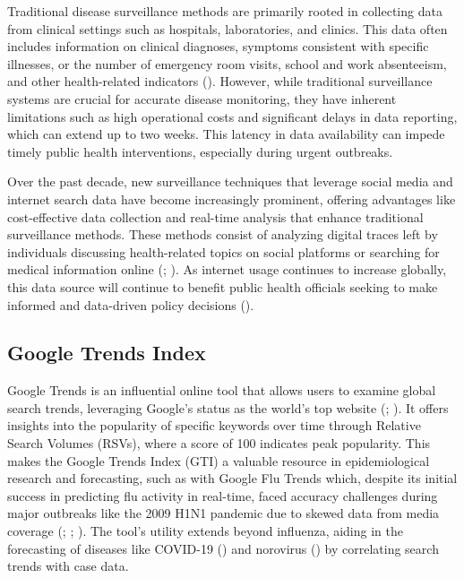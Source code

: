 \documentclass[
  12pt,
]{article}
\begin{document}
Traditional disease surveillance methods are primarily rooted in
collecting data from clinical settings such as hospitals, laboratories,
and clinics. This data often includes information on clinical diagnoses,
symptoms consistent with specific illnesses, or the number of emergency
room visits, school and work absenteeism, and other health-related
indicators (). However,
while traditional surveillance systems are crucial for accurate disease
monitoring, they have inherent limitations such as high operational
costs and significant delays in data reporting, which can extend up to
two weeks. This latency in data availability can impede timely public
health interventions, especially during urgent outbreaks.

Over the past decade, new surveillance techniques that leverage social
media and internet search data have become increasingly prominent,
offering advantages like cost-effective data collection and real-time
analysis that enhance traditional surveillance methods. These methods
consist of analyzing digital traces left by individuals discussing
health-related topics on social platforms or searching for medical
information online (; ). As
internet usage continues to increase globally, this data source will
continue to benefit public health officials seeking to make informed and
data-driven policy decisions ().

\subsection{Google Trends Index}\label{google-trends-index}

Google Trends is an influential online tool that allows users to examine
global search trends, leveraging Google's status as the world's top
website (;
). It offers insights into the
popularity of specific keywords over time through Relative Search
Volumes (RSVs), where a score of 100 indicates peak popularity. This
makes the Google Trends Index (GTI) a valuable resource in
epidemiological research and forecasting, such as with Google Flu Trends
which, despite its initial success in predicting flu activity in
real-time, faced accuracy challenges during major outbreaks like the
2009 H1N1 pandemic due to skewed data from media coverage
(;
;
). The tool's utility extends
beyond influenza, aiding in the forecasting of diseases like COVID-19
() and norovirus
() by correlating search
trends with case data.
\end{document}
